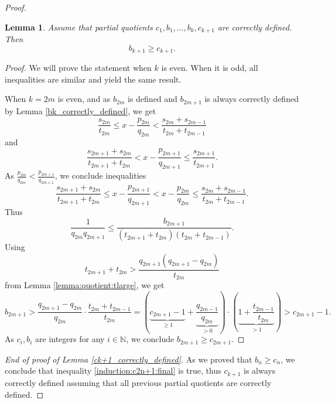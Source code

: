 \documentclass{amsart}
\newtheorem{lemma}[theorem]{Lemma}
\theoremstyle{definition}
\newcommand{\N}{\mathbb N}%
\newcommand{\0}{\mbf 0}%
\def\N{\mathbb N}
\begin{document}
\begin{proof}

\begin{lemma}\label{lemma:growth:bn}
Assume that partial quotients $c_1,b_1,\ldots,b_{k},c_{k+1}$ are correctly defined. Then 
$$
b_{k+1}\geq c_{k+1}.
$$  
\end{lemma}
\begin{proof}
We will prove the statement when $k$ is even. When it is odd, all inequalities are similar and yield the same result.

When $k=2m$ is even, and as $b_{2m}$ is defined and $b_{2m+1}$ is always correctly defined by Lemma \ref{bk_correctly_defined},  we get
$$
\frac{s_{2m}}{t_{2m}} \leq  x - \frac{p_{2m}}{q_{2m}} < \frac{s_{2m}+s_{2m-1}}{t_{2m}+t_{2m-1}}
$$
and 
$$
\frac{s_{2m+1}+s_{2m}}{t_{2m+1}+t_{2m}}  < x - \frac{p_{2m+1}}{q_{2m+1}}   \leq \frac{s_{2m+1}}{t_{2m+1}}.
$$
As $\frac{p_{2m}}{q_{2m}}<\frac{p_{2m+1}}{q_{2m+1}} $, we conclude inequalities
$$
\frac{s_{2m+1}+s_{2m}}{t_{2m+1}+t_{2m}}\leq x - \frac{p_{2m+1}}{q_{2m+1}} < x - \frac{p_{2m}}{q_{2m}} \leq \frac{s_{2m}+s_{2m-1}}{t_{2m}+t_{2m-1}}.
$$
Thus
$$
\frac{1}{q_{2m}q_{2m+1}} \leq \frac{b_{2m+1}}{(t_{2m+1}+t_{2m})(t_{2m}+t_{2m-1})}.
$$
Using 
$$
t_{2m+1}+t_{2m} > \frac{q_{2m+1}(q_{2m+1}-q_{2m})}{t_{2m}}
$$
from Lemma \ref{lemma:quotient:tlarge}, we get
$$
b_{2m+1} > \frac{q_{2m+1}-q_{2m}}{q_{2m}}\cdot \frac{t_{2m}+t_{2m-1}}{t_{2m}} = \left( \underbrace{c_{2m+1}-1}_{\geq1}+\underbrace{\frac{q_{2m-1}}{q_{2m}}}_{>0} \right)\cdot \left( \underbrace{1+\frac{t_{2m-1}}{t_{2m}}}_{>1} \right) > c_{2m+1}-1.
$$
As $c_i,b_i$ are integers for any $i\in\N$, we conclude $b_{2m+1} \geq c_{2m+1}.$
\end{proof}

\textit{End of proof of Lemma \ref{ck+1_correctly_defined}. }
As we proved that $b_n\geq c_n$, we conclude that inequality \eqref{induction:c2n+1:final} is true, thus $c_{k+1}$ is always correctly defined assuming that all previous partial quotients are correctly defined. \end{proof}
\end{document}
